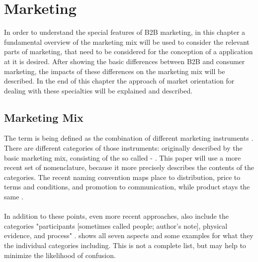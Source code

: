 \section{Marketing}
In order to understand the special features of B2B marketing, in this chapter a fundamental overview of the marketing mix will be used to consider the relevant parts of marketing, that need to be considered for the conception of a application at it is desired. After showing the basic differences between B2B and consumer marketing, the impacts of these differences on the marketing mix will be described. In the end of this chapter the approach of market orientation for dealing with these specialties will be explained and described.

\subsection{Marketing Mix}
The term  is being defined as the combination of different marketing instruments \parencite[cf.][285]{Thommen.2012}. There are  different categories of those instruments: originally described by \textcite[cf.][]{McCarthy.1993} the basic marketing mix, consisting of the so called  -  . This paper will use a more recent set of nomenclature, because it more precisely describes the contents of the categories. The recent naming convention maps place to distribution, price to terms and conditions, and promotion to communication, while product stays the same \parencites[285]{Thommen.2012}[cf.][397-720]{Meffert.2015}. 

\paragraph*{} In addition to these points, even more recent approaches, also include the categories "participants [sometimes called people; author's note], physical evidence, and process" \parencite[5]{Rafiq.1995}.  shows all seven aspects and some examples for what they the individual categories including. This is not a complete list, but may help to minimize the likelihood of confusion. 

